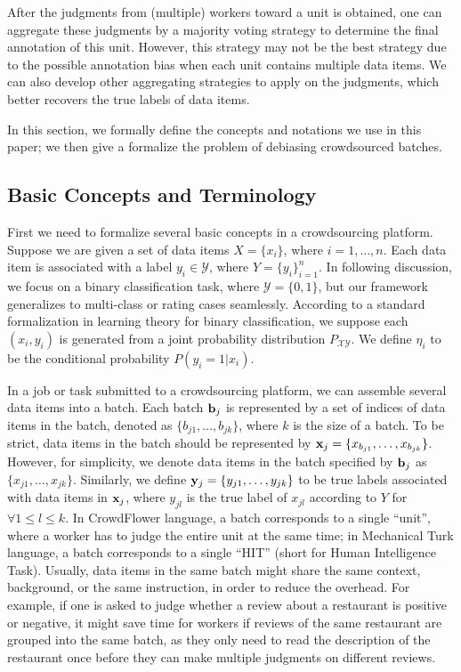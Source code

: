 {After the judgments from (multiple) workers toward a unit is obtained,
one can aggregate these judgments by a majority voting strategy to determine the final annotation of this unit.
However, this strategy may not be the best strategy due to the possible annotation bias when each unit contains multiple data items.
We can also develop other aggregating strategies to apply on the judgments,
which better recovers the true labels of data items.
}

%

In this section, we formally define the concepts and notations we use in this paper;
we then give a formalize the problem of debiasing crowdsourced batches.


\subsection{Basic Concepts and Terminology}

First we need to formalize several basic concepts in a crowdsourcing platform.
Suppose we are given a set of data items $X = \{x_i\}$, where $i=1, \ldots, n$.
Each data item is associated with a label $y_i \in \mathcal{Y}$, where $Y = \{y_i\}_{i=1}^n$.
In following discussion, we focus on a binary classification task, 
where $\mathcal{Y} = \{0, 1\}$, 
but our framework generalizes to multi-class or rating cases seamlessly.  
According to a standard formalization in learning theory for binary classification, 
we suppose each $(x_i, y_i)$ is generated from a joint probability distribution $P_{\mathcal{X} \mathcal{Y}}$.
We define $\eta_i$ to be the conditional probability $P(y_i = 1 | x_i)$. 

In a job or task submitted to a crowdsourcing platform,
we can assemble several data items into a batch. %
Each batch ${\mathbf{b}}_j$ is represented by a set of indices of data items in the batch,
denoted as $\{b_{j1}, \ldots, b_{jk}\}$, 
where $k$ is the size of a batch. 
To be strict, data items in the batch should be represented by ${\mathbf{x}}_j = \{x_{b_{j1}}, \ldots, x_{b_{jk}}\}$.  
However, for simplicity, we denote data items in the batch specified by ${\mathbf{b}}_j$ as $\{x_{j1}, \ldots, x_{jk}\}$.  
Similarly, we define ${\mathbf{y}}_j = \{y_{j1}, \ldots, y_{jk}\}$ to be true labels associated with data items in ${\mathbf{x}}_j$, 
where $y_{jl}$ is the true label of $x_{jl}$ according to $Y$ for $\forall 1 \leq l \leq k$.  
In CrowdFlower language, 
a batch corresponds to a single ``unit'', 
where a worker has to judge the entire unit at the same time;
in Mechanical Turk language,
a batch corresponds to a single ``HIT'' (short for Human Intelligence Task).
Usually, data items in the same batch might share the same context, background, or the same instruction, 
in order to reduce the overhead.  
For example, if one is asked to judge whether 
a review about a restaurant is positive or negative, 
it might save time for workers if 
reviews of the same restaurant are grouped into the same batch, 
as they only need to read the description of the restaurant once 
before they can make multiple judgments on different reviews.  

